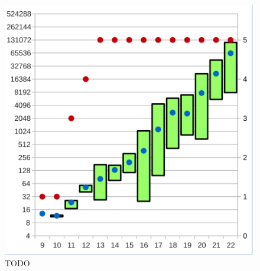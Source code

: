 \begin{figure}[!h]
\begin{minipage}[c]{0.45\textwidth}
  \includegraphics[scale=0.55]{images/data_dist_xor}
  \end{minipage}
  \caption{TODO}
  \label{fig:data_dist}
\end{figure}